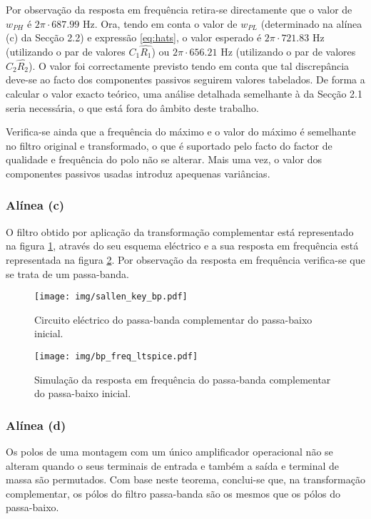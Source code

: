 Por observação da resposta em frequência retira-se directamente que o valor de $w_{PH}$ é $2\pi \cdot 687.99$ Hz. Ora, tendo em conta o valor de $w_{PL}$ (determinado na alínea (c) da Secção 2.2) e expressão \ref{eq:hats}, o valor esperado é $2\pi \cdot 721.83$ Hz (utilizando o par de valores $C_1 \hat{R_1}$) ou $2\pi \cdot 656.21$ Hz (utilizando o par de valores $C_2 \hat{R_2}$). O valor foi correctamente previsto tendo em conta que tal discrepância deve-se ao facto dos componentes passivos seguirem valores tabelados. De forma a calcular o valor exacto teórico, uma análise detalhada semelhante à da Secção 2.1 seria necessária, o que está fora do âmbito deste trabalho.

Verifica-se ainda que a frequência do máximo e o valor do máximo é semelhante no filtro original e transformado, o que é suportado pelo facto do factor de qualidade e frequência do polo não se alterar. Mais uma vez, o valor dos componentes passivos usadas introduz apequenas variâncias.

\subsubsection*{Alínea (c)}

O filtro obtido por aplicação da transformação complementar está representado na figura \ref{fig:bp_transf_circ}, através do seu esquema eléctrico e a sua resposta em frequência está representada na figura \ref{fig:sim_bp}. Por observação da resposta em frequência verifica-se que se trata de um passa-banda.

\begin{figure}[!thpb]
\centering
\texttt{[image: img/sallen\_key\_bp.pdf]}
\caption{Circuito eléctrico do passa-banda complementar do passa-baixo inicial.}
\label{fig:bp_transf_circ}
\end{figure}

\begin{figure}[!thpb]
\centering
\texttt{[image: img/bp\_freq\_ltspice.pdf]}
\caption{Simulação da resposta em frequência do passa-banda complementar do passa-baixo inicial.}
\label{fig:sim_bp}
\end{figure}


\subsubsection*{Alínea (d)}

Os polos de uma montagem com um único amplificador operacional não se alteram quando o seus terminais de entrada e também a saída e terminal de massa são permutados. Com base neste teorema, conclui-se que, na transformação complementar, os pólos do filtro passa-banda são os mesmos que os pólos do passa-baixo.

